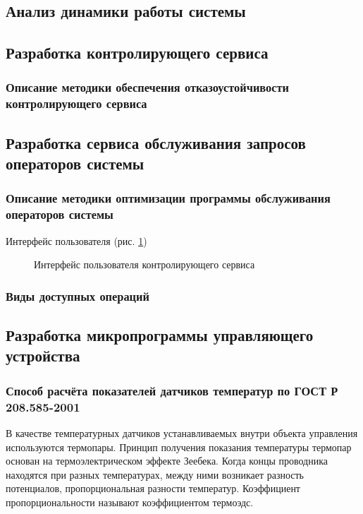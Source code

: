 \subsection{Анализ динамики работы системы}

\subsection{Разработка контролирующего сервиса}

\subsubsection{Описание методики обеспечения отказоустойчивости контролирующего
сервиса}

\subsection{Разработка сервиса обслуживания запросов операторов системы}


\subsubsection{Описание методики оптимизации программы обслуживания операторов системы}
Интерфейс пользователя (рис. \ref{img:acsIf}) 

\begin{figure}[h]
	\caption{Интерфейс пользователя контролирующего сервиса}
	\label{img:acsIf}
\end{figure}

\subsubsection{Виды доступных операций}



\subsection{Разработка микропрограммы управляющего устройства}

\subsubsection{Способ расчёта показателей датчиков температур по
ГОСТ Р 208.585-2001}
В качестве температурных датчиков устанавливаемых внутри объекта управления используются
термопары. Принцип получения показания температуры термопар основан на
термоэлектрическом эффекте Зеебека. Когда концы проводника находятся при разных температурах,
между ними возникает разность потенциалов, пропорциональная разности температур.
Коэффициент пропорциональности называют коэффициентом термоэдс.

